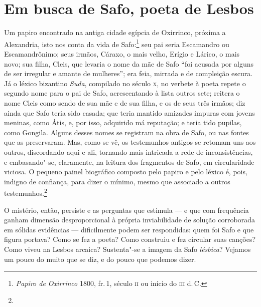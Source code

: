 \section*{Em busca de Safo, poeta de Lesbos}

Um papiro encontrado na antiga cidade egípcia de Oxirrinco, próxima a
Alexandria, isto nos conta da vida de Safo:\footnote{\emph{Papiro de Oxirrinco} 1800,
fr.\,1, século \textsc{ii} ou início do \textsc{iii} d.\,C.} seu pai seria Escamandro ou
Escamandrônimo; seus irmãos, Cáraxo, o mais velho, Erígio e Lárico, o mais
novo; sua filha, Cleis, que levaria o nome da mãe de Safo ``foi acusada
por alguns de ser irregular e amante de mulheres”; era feia, mirrada e de
compleição escura. Já o léxico bizantino \emph{Suda}, compilado no século \textsc{x},
no verbete à poeta repete o segundo nome para o pai de Safo, acrescentando à
lista outros sete; reitera o nome Cleis como sendo de sua mãe e de sua filha, e
os de seus três irmãos; diz ainda que Safo teria sido casada; que teria mantido
amizades impuras com jovens meninas, como Átis, e, por isso, adquirido má
reputação; e teria tido pupilas, como Gongila. Alguns desses nomes se registram
na obra de Safo, ou nas fontes que as preservaram. Mas, como se vê, os
testemunhos antigos se retomam uns aos outros, discordando aqui e ali, tornando
mais intricada a rede de inconsistências, e embasando"-se, claramente, na
leitura dos fragmentos de Safo, em circularidade viciosa. O pequeno painel
biográfico composto pelo papiro e pelo léxico é, pois, indigno de confiança,
para dizer o mínimo, mesmo que associado a outros testemunhos.\footnote{}

O mistério, então, persiste e as perguntas que estimula --- e que com frequência
ganham dimensão desproporcional à própria inviabilidade de solução
corroborada em sólidas evidências --- dificilmente podem ser respondidas: quem
foi Safo e que figura portava? Como se fez a poeta? Como construiu e fez
circular suas canções? Como viveu na Lesbos arcaica? Sustenta"-se a imagem da
Safo \emph{lésbica}? Vejamos um pouco do muito que se diz, e do
pouco que podemos dizer.

